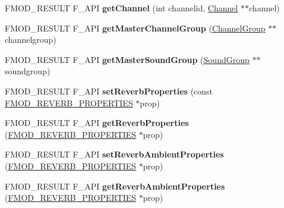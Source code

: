 \begin{DoxyCompactItemize}
\item 
F\+M\+O\+D\+\_\+\+R\+E\+S\+U\+LT F\+\_\+\+A\+PI {\bfseries get\+Channel} (int channelid, \hyperlink{class_f_m_o_d_1_1_channel}{Channel} $\ast$$\ast$channel)\hypertarget{class_f_m_o_d_1_1_system_ada0bf180aafd95d6311fc6b743251299}{}\label{class_f_m_o_d_1_1_system_ada0bf180aafd95d6311fc6b743251299}

\item 
F\+M\+O\+D\+\_\+\+R\+E\+S\+U\+LT F\+\_\+\+A\+PI {\bfseries get\+Master\+Channel\+Group} (\hyperlink{class_f_m_o_d_1_1_channel_group}{Channel\+Group} $\ast$$\ast$channelgroup)\hypertarget{class_f_m_o_d_1_1_system_ac175dc5bc0e78ce2b52eddff65d16411}{}\label{class_f_m_o_d_1_1_system_ac175dc5bc0e78ce2b52eddff65d16411}

\item 
F\+M\+O\+D\+\_\+\+R\+E\+S\+U\+LT F\+\_\+\+A\+PI {\bfseries get\+Master\+Sound\+Group} (\hyperlink{class_f_m_o_d_1_1_sound_group}{Sound\+Group} $\ast$$\ast$soundgroup)\hypertarget{class_f_m_o_d_1_1_system_abb21546d80d099e01c58b3c7235b345d}{}\label{class_f_m_o_d_1_1_system_abb21546d80d099e01c58b3c7235b345d}

\item 
F\+M\+O\+D\+\_\+\+R\+E\+S\+U\+LT F\+\_\+\+A\+PI {\bfseries set\+Reverb\+Properties} (const \hyperlink{struct_f_m_o_d___r_e_v_e_r_b___p_r_o_p_e_r_t_i_e_s}{F\+M\+O\+D\+\_\+\+R\+E\+V\+E\+R\+B\+\_\+\+P\+R\+O\+P\+E\+R\+T\+I\+ES} $\ast$prop)\hypertarget{class_f_m_o_d_1_1_system_afce98598bcad6bd6d27a8739545617e6}{}\label{class_f_m_o_d_1_1_system_afce98598bcad6bd6d27a8739545617e6}

\item 
F\+M\+O\+D\+\_\+\+R\+E\+S\+U\+LT F\+\_\+\+A\+PI {\bfseries get\+Reverb\+Properties} (\hyperlink{struct_f_m_o_d___r_e_v_e_r_b___p_r_o_p_e_r_t_i_e_s}{F\+M\+O\+D\+\_\+\+R\+E\+V\+E\+R\+B\+\_\+\+P\+R\+O\+P\+E\+R\+T\+I\+ES} $\ast$prop)\hypertarget{class_f_m_o_d_1_1_system_a05177df319c03309058e450c4cc767af}{}\label{class_f_m_o_d_1_1_system_a05177df319c03309058e450c4cc767af}

\item 
F\+M\+O\+D\+\_\+\+R\+E\+S\+U\+LT F\+\_\+\+A\+PI {\bfseries set\+Reverb\+Ambient\+Properties} (\hyperlink{struct_f_m_o_d___r_e_v_e_r_b___p_r_o_p_e_r_t_i_e_s}{F\+M\+O\+D\+\_\+\+R\+E\+V\+E\+R\+B\+\_\+\+P\+R\+O\+P\+E\+R\+T\+I\+ES} $\ast$prop)\hypertarget{class_f_m_o_d_1_1_system_a17893e303c0ffb6c9c4693a53e2db288}{}\label{class_f_m_o_d_1_1_system_a17893e303c0ffb6c9c4693a53e2db288}

\item 
F\+M\+O\+D\+\_\+\+R\+E\+S\+U\+LT F\+\_\+\+A\+PI {\bfseries get\+Reverb\+Ambient\+Properties} (\hyperlink{struct_f_m_o_d___r_e_v_e_r_b___p_r_o_p_e_r_t_i_e_s}{F\+M\+O\+D\+\_\+\+R\+E\+V\+E\+R\+B\+\_\+\+P\+R\+O\+P\+E\+R\+T\+I\+ES} $\ast$prop)\hypertarget{class_f_m_o_d_1_1_system_a7bccc1c1c58f331bda60c4340d034790}{}\label{class_f_m_o_d_1_1_system_a7bccc1c1c58f331bda60c4340d034790}


\end{DoxyCompactItemize}
